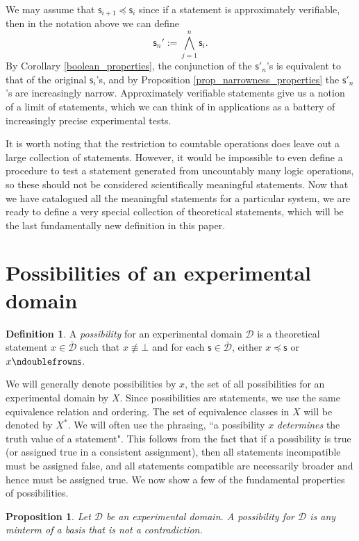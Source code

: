 \documentclass[psamsfonts]{amsart}
\newtheorem{prop}[thm]{Proposition}
\theoremstyle{definition}
\newtheorem{defn}[thm]{Definition}
\theoremstyle{remark}
\numberwithin{equation}{section}
\def\contradiction{\bot}
\def\ncomp{\ndoublefrown}
\def\narrower{\preccurlyeq}
\def\bigAND{\bigwedge}
\newcommand{\stmt}[1][s] {\mathsf{#1}}
\newcommand{\edomain}[1][D] {\mathcal{#1}}
\newcommand{\tdomain}[1][D] {\bar{\mathcal{#1}}}
\begin{document}
We may assume that $\stmt_{i+1}\narrower\stmt_i$ since if a statement is approximately verifiable, then in the notation above we can define $$\stmt_n' := \bigAND\limits_{j=1}^n\stmt_i.$$ By Corollary \ref{boolean_properties}, the conjunction of the $\stmt'_n$'s is equivalent to that of the original $\stmt_i$'s, and by Proposition \ref{prop_narrowness_properties} the $\stmt'_n$'s are increasingly narrow. Approximately verifiable statements give us a notion of a limit of statements, which we can think of in applications as a battery of increasingly precise experimental tests. 

It is worth noting that the restriction to countable operations does leave out a large collection of statements. However, it would be impossible to even define a procedure to test a statement generated from uncountably many logic operations, so these should not be considered scientifically meaningful statements. Now that we have catalogued all the meaningful statements for a particular system, we are ready to define a very special collection of theoretical statements, which will be the last fundamentally new definition in this paper. 

\section{Possibilities of an experimental domain}
\label{possibilities}

\begin{defn}
A \emph{possibility} for an experimental domain $\edomain$ is a theoretical statement $x\in\tdomain$ such that $x \nequiv \contradiction$ and for each $\mathsf{s} \in \tdomain$, either $x \narrower \mathsf{s}$ or $x \ncomp \mathsf{s}$. 
\end{defn}

We will generally denote possibilities by $x$, the set of all possibilities for an experimental domain by $X$. Since possibilities are statements, we use the same equivalence relation and ordering. The set of equivalence classes in $X$ will be denoted by $X^*$. We will often use the phrasing, ``a possibility $x$ \emph{determines} the truth value of a statement". This follows from the fact that if a possibility is true (or assigned true in a consistent assignment), then all statements incompatible must be assigned false, and all statements compatible are necessarily broader and hence must be assigned true. We now show a few of the fundamental properties of possibilities. 


\begin{prop}\label{prop_poss_is_minterm}
	Let $\edomain$ be an experimental domain. A possibility for $\edomain$ is any minterm of a basis that is not a contradiction.
\end{prop}
\end{document}

